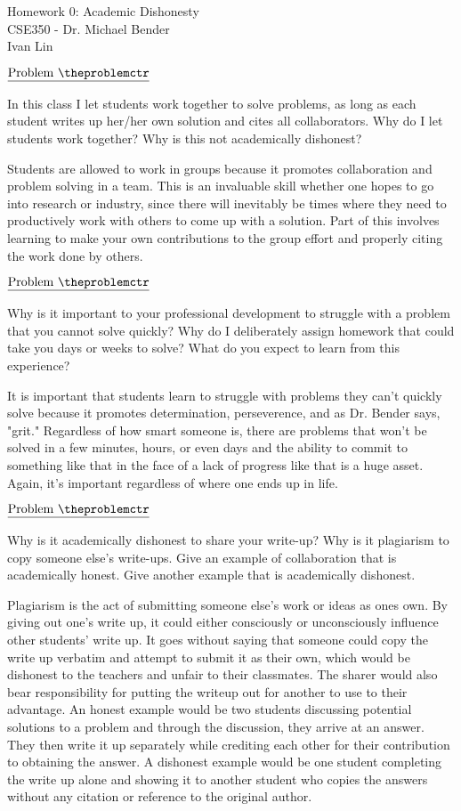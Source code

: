 \documentclass[11pt]{article}
\def\pp{\par\noindent}
\begin{document}
\LARGE{Homework 0: Academic Dishonesty}\\
\normalsize
CSE350 - Dr. Michael Bender\\
Ivan Lin

\addtocounter{problemctr}{1}
\bigskip
\noindent
$\underline{\rm Problem\ \theproblemctr}$\pp
%
In this class I let students work together to solve problems, as long
as each student writes up her/her own solution and cites all
collaborators.  Why do I let students work together?  Why is this not
academically dishonest?

Students are allowed to work in groups because it promotes collaboration and problem solving in a team. This is an invaluable skill whether one hopes to go into research or industry, since there will inevitably be times where they need to productively work with others to come up with a solution. Part of this involves learning to make your own contributions to the group effort and properly citing the work done by others.

\addtocounter{problemctr}{1}
\bigskip
\noindent
$\underline{\rm Problem\ \theproblemctr}$\pp
%
Why is it important to your professional development to struggle with
a problem that you cannot solve quickly?  Why do I deliberately assign
homework that could take you days or weeks to solve?  What do you
expect to learn from this experience?

It is important that students learn to struggle with problems they can't quickly solve because it promotes determination, perseverence, and as Dr. Bender says, "grit." Regardless of how smart someone is, there are problems that won't be solved in a few minutes, hours, or even days and the ability to commit to something like that in the face of a lack of progress like that is a huge asset. Again, it's important regardless of where one ends up in life.

\addtocounter{problemctr}{1}
\bigskip
\noindent
$\underline{\rm Problem\ \theproblemctr}$\pp
%
Why is it academically dishonest to share your write-up?  Why is it
plagiarism to copy someone else's write-ups.  Give an example of
collaboration that is academically honest.  Give another example that
is academically dishonest.

Plagiarism is the act of submitting someone else's work or ideas as ones own. By giving out one's write up, it could either consciously or unconsciously influence other students' write up. It goes without saying that someone could copy the write up verbatim and attempt to submit it as their own, which would be dishonest to the teachers and unfair to their classmates. The sharer would also bear responsibility for putting the writeup out for another to use to their advantage. An honest example would be two students discussing potential solutions to a problem and through the discussion, they arrive at an answer. They then write it up separately while crediting each other for their contribution to obtaining the answer. A dishonest example would be one student completing the write up alone and showing it to another student who copies the answers without any citation or reference to the original author.
\end{document}
